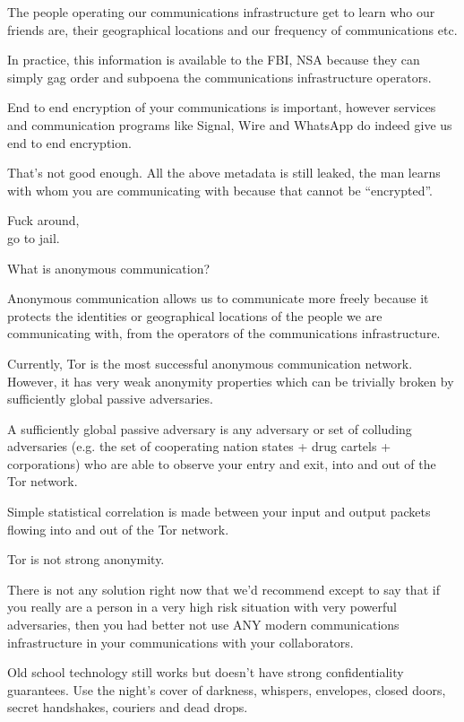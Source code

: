 \documentclass[statementpaper,oneside,article,14pt]{memoir}
\begin{document}
\newpage

The people operating our communications infrastructure
get to learn who our friends are, their geographical locations and
our frequency of communications etc.

In practice, this information is available to the FBI, NSA because they
can simply gag order and subpoena the communications infrastructure operators.

End to end encryption of your communications is important, however
services and communication programs like Signal, Wire and WhatsApp do
indeed give us end to end encryption.

That's not good enough. All the above metadata is still leaked, the man learns
with whom you are communicating with because that cannot be ``encrypted''.

Fuck around,\\
go to jail.

\newpage

What is anonymous communication?

Anonymous communication allows us to communicate more freely because
it protects the identities or geographical locations of the people we
are communicating with, from the operators of the communications
infrastructure.

Currently, Tor is the most successful anonymous communication network.
However, it has very weak anonymity properties which can be trivially
broken by sufficiently global passive adversaries.

A sufficiently global passive adversary is any adversary or set of colluding
adversaries (e.g. the set of cooperating nation states + drug cartels + corporations)
who are able to observe your entry and exit, into and out of the Tor network.

Simple statistical correlation is made between your input and output packets flowing
into and out of the Tor network.

Tor is not strong anonymity.

\newpage

There is not any solution right now that we'd recommend except to say
that if you really are a person in a very high risk situation with
very powerful adversaries, then you had better not use ANY modern
communications infrastructure in your communications with your
collaborators.

Old school technology still works but doesn't have strong
confidentiality guarantees. Use the night's cover of darkness,
whispers, envelopes, closed doors, secret handshakes,
couriers and dead drops.
\end{document}
